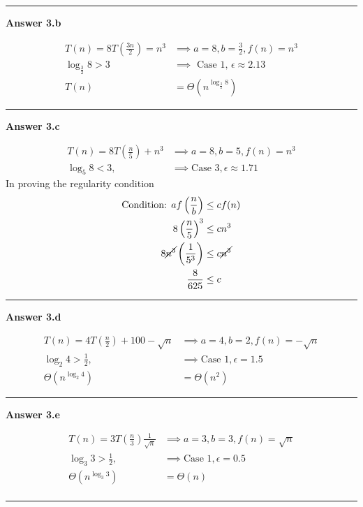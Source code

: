 \documentclass{article}
\begin{document}
\rule{\textwidth}{.2pt}


\textbf{Answer 3.b}

\begin{align}
    T(n) = 8T \left( \frac{3n}{2} \right) = n^3 & \implies a = 8, b = 
        \frac{3}{2}, f(n) = n^3  \\
    \log_{\frac{3}{2}}8 > 3 & \implies \text{ Case 1, } \epsilon \approx 2.13 \\
    T(n) & = \Theta \left( n^{\log_{\frac{3}{2}}8} \right)
\end{align}

\rule{\textwidth}{.2pt}


\textbf{Answer 3.c}

\begin{align}
    T(n) = 8T \left( \frac{n}{5} \right) + n^{3} & \implies a = 8, b = 5, f(n) =
        n^{3} \\
    \log_{5}8 < 3, & \implies \text{Case 3}, \epsilon \approx 1.71
\end{align}
In proving the regularity condition
\begin{align}
    \text{Condition: } af \left( \frac{n}{b} \right) & \le cf(n)  \\
    8 \left( \frac{n}{5} \right)^{3} & \le cn^{3}  \\
    8 \cancel{n^{3}} \left( \frac{1}{5^{3}} \right) & \le c \cancel{n^{3}}  \\
    \frac{8}{625} & \le c
\end{align}
\rule{\textwidth}{.2pt}


\textbf{Answer 3.d}

\begin{align}
    T(n) = 4T \left( \frac{n}{2} \right) + 100 - \sqrt{n} & \implies a = 4, b = 
        2, f(n) = -\sqrt{n} \\
    \log_{2}4 > \frac{1}{2}, & \implies \text{Case 1}, \epsilon = 1.5  \\
    \Theta \left( n^{\log_{2}4} \right) & = \Theta(n^2)
\end{align}
\rule{\textwidth}{.2pt}


\textbf{Answer 3.e}

\begin{align}
    T(n) = 3T \left( \frac{n}{3} \right) \frac{1}{\sqrt{n}} & \implies a = 3, b
        = 3, f(n) = \sqrt{n} \\
    \log_{3}3 > \frac{1}{2}, & \implies \text{Case 1}, \epsilon = 0.5  \\
    \Theta \left( n^{\log_{3}3} \right) & = \Theta(n)  \\
\end{align}
\rule{\textwidth}{.2pt}
\end{document}
